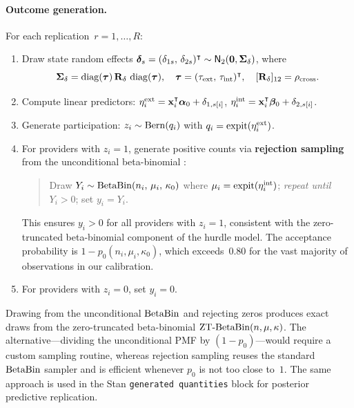\paragraph{Outcome generation.}
For each replication~$r = 1,\ldots,R$:
\begin{enumerate}
  \item Draw state random effects
    $\boldsymbol{\delta}_s = (\delta_{1s},\, \delta_{2s})^\intercal \sim
    \textsf{N}_2(\mathbf{0}, \boldsymbol{\Sigma}_\delta)$, where
    \[
      \boldsymbol{\Sigma}_\delta = \operatorname{diag}(\boldsymbol{\tau})\,
      \mathbf{R}_\delta\,\operatorname{diag}(\boldsymbol{\tau}),
      \quad
      \boldsymbol{\tau} = (\tau_{\text{ext}},\,\tau_{\text{int}})^\intercal,
      \quad
      [\mathbf{R}_\delta]_{12} = \rho_{\text{cross}}.
    \]
  \item Compute linear predictors:
    $\eta_i^{\text{ext}} = \mathbf{x}_i^\intercal\boldsymbol{\alpha}_0 + \delta_{1,s[i]}$,
    $\eta_i^{\text{int}} = \mathbf{x}_i^\intercal\boldsymbol{\beta}_0 + \delta_{2,s[i]}$.
  \item Generate participation:
    $z_i \sim \operatorname{Bern}(q_i)$ with
    $q_i = \operatorname{expit}(\eta_i^{\text{ext}})$.
  \item For providers with $z_i = 1$, generate positive counts via
    \textbf{rejection sampling} from the unconditional beta-binomial
    \citep{Prentice1986}:
    \begin{quote}
      Draw $Y_i \sim \operatorname{BetaBin}(n_i,\, \mu_i,\, \kappa_0)$ where
      $\mu_i = \operatorname{expit}(\eta_i^{\text{int}})$;
      \emph{repeat until $Y_i > 0$}; set $y_i = Y_i$.
    \end{quote}
    This ensures $y_i > 0$ for all providers with $z_i = 1$,
    consistent with the zero-truncated beta-binomial component of
    the hurdle model.  The acceptance probability is $1 - p_0(n_i,
    \mu_i, \kappa_0)$, which exceeds~$0.80$ for the vast majority
    of observations in our calibration.
  \item For providers with $z_i = 0$, set $y_i = 0$.
\end{enumerate}

\begin{remark}
  \label{smf:rem-ztbb}
  Drawing from the unconditional $\operatorname{BetaBin}$ and rejecting zeros
  produces exact draws from the zero-truncated beta-binomial
  $\operatorname{ZT\text{-}BetaBin}(n, \mu, \kappa)$.  The alternative---dividing the
  unconditional PMF by $(1-p_0)$---would require a custom
  sampling routine, whereas rejection sampling reuses the
  standard $\operatorname{BetaBin}$ sampler and is efficient whenever $p_0$ is
  not too close to~$1$.  The same approach is used in the
  Stan \texttt{generated quantities} block for posterior
  predictive replication.
\end{remark}

